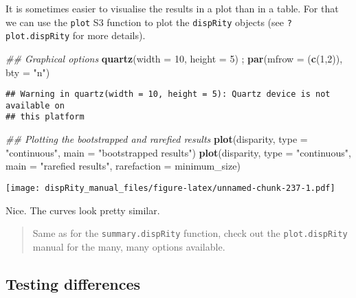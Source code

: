 \documentclass[
]{book}
\newenvironment{Shaded}{\begin{snugshade}}{\end{snugshade}}
\newcommand{\CommentTok}[1]{\textcolor[rgb]{0.56,0.35,0.01}{\textit{#1}}}
\newcommand{\DataTypeTok}[1]{\textcolor[rgb]{0.13,0.29,0.53}{#1}}
\newcommand{\DecValTok}[1]{\textcolor[rgb]{0.00,0.00,0.81}{#1}}
\newcommand{\KeywordTok}[1]{\textcolor[rgb]{0.13,0.29,0.53}{\textbf{#1}}}
\newcommand{\NormalTok}[1]{#1}
\newcommand{\StringTok}[1]{\textcolor[rgb]{0.31,0.60,0.02}{#1}}
\begin{document}
It is sometimes easier to visualise the results in a plot than in a table.
For that we can use the \texttt{plot} S3 function to plot the \texttt{dispRity} objects (see \texttt{?plot.dispRity} for more details).

\begin{Shaded}
\begin{Highlighting}[]
\CommentTok{\#\# Graphical options}
\KeywordTok{quartz}\NormalTok{(}\DataTypeTok{width =} \DecValTok{10}\NormalTok{, }\DataTypeTok{height =} \DecValTok{5}\NormalTok{) ; }\KeywordTok{par}\NormalTok{(}\DataTypeTok{mfrow =}\NormalTok{ (}\KeywordTok{c}\NormalTok{(}\DecValTok{1}\NormalTok{,}\DecValTok{2}\NormalTok{)), }\DataTypeTok{bty =} \StringTok{"n"}\NormalTok{)}
\end{Highlighting}
\end{Shaded}

\begin{verbatim}
## Warning in quartz(width = 10, height = 5): Quartz device is not available on
## this platform
\end{verbatim}

\begin{Shaded}
\begin{Highlighting}[]
\CommentTok{\#\# Plotting the bootstrapped and rarefied results}
\KeywordTok{plot}\NormalTok{(disparity, }\DataTypeTok{type =} \StringTok{"continuous"}\NormalTok{, }\DataTypeTok{main =} \StringTok{"bootstrapped results"}\NormalTok{)}
\KeywordTok{plot}\NormalTok{(disparity, }\DataTypeTok{type =} \StringTok{"continuous"}\NormalTok{, }\DataTypeTok{main =} \StringTok{"rarefied results"}\NormalTok{,}
     \DataTypeTok{rarefaction =}\NormalTok{ minimum\_size)}
\end{Highlighting}
\end{Shaded}

\texttt{[image: dispRity\_manual\_files/figure-latex/unnamed-chunk-237-1.pdf]}

Nice. The curves look pretty similar.

\begin{quote}
Same as for the \texttt{summary.dispRity} function, check out the \texttt{plot.dispRity} manual for the many, many options available.
\end{quote}

\hypertarget{testing-differences}{%
\subsection{Testing differences}\label{testing-differences}}
\end{document}
